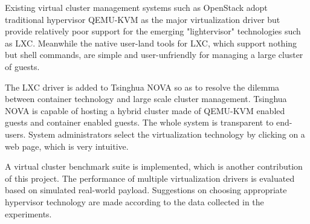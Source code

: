
\begin{eabstract}
Existing virtual cluster management systems such as OpenStack adopt traditional
hypervisor QEMU-KVM as the major virtualization driver but provide relatively
poor support for the emerging "lightervisor" technologies such as LXC. Meanwhile
the native user-land tools for LXC, which support nothing but shell commands,
are simple and user-unfriendly for managing a large cluster of guests.

The LXC driver is added to Tsinghua NOVA so as to resolve the dilemma between
container technology and large scale cluster management. Tsinghua NOVA is
capable of hosting a hybrid cluster made of QEMU-KVM enabled guests and
container enabled guests. The whole system is transparent to end-users.
System administrators select the virtualization technology by clicking on
a web page, which is very intuitive.

A virtual cluster benchmark suite is implemented, which is another contribution
of this project. The performance of multiple virtualization drivers is
evaluated based on simulated real-world payload. Suggestions on choosing
appropriate hypervisor technology are made according to the data collected
in the experiments.
\end{eabstract}

